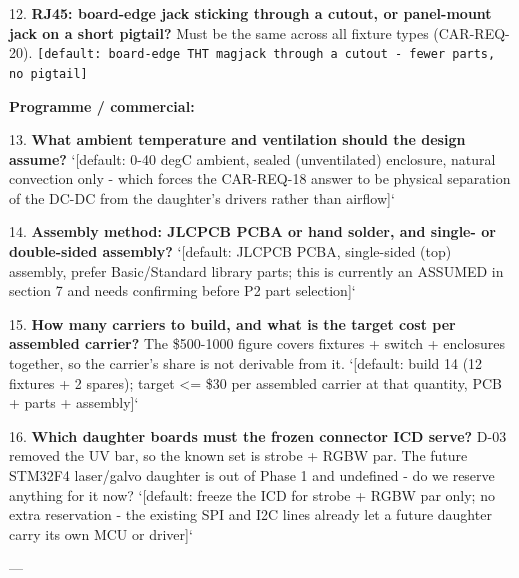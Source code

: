 \documentclass[11pt,a4paper]{article}
\begin{document}
12. \textbf{RJ45: board-edge jack sticking through a cutout, or panel-mount jack on a short pigtail?} Must be the same across all fixture types (CAR-REQ-20). \texttt{{[}default: board-edge THT magjack through a cutout - fewer parts, no pigtail{]}}

\textbf{Programme / commercial:}

13. \textbf{What ambient temperature and ventilation should the design assume?} `{[}default: 0-40 degC ambient, sealed (unventilated) enclosure, natural convection only - which forces the CAR-REQ-18 answer to be physical separation of the DC-DC from the daughter's drivers rather than airflow{]}`

14. \textbf{Assembly method: JLCPCB PCBA or hand solder, and single- or double-sided assembly?} `{[}default: JLCPCB PCBA, single-sided (top) assembly, prefer Basic/Standard library parts; this is currently an ASSUMED in section 7 and needs confirming before P2 part selection{]}`

15. \textbf{How many carriers to build, and what is the target cost per assembled carrier?} The \$500-1000 figure covers fixtures + switch + enclosures together, so the carrier's share is not derivable from it. `{[}default: build 14 (12 fixtures + 2 spares); target \textless{}= \$30 per assembled carrier at that quantity, PCB + parts + assembly{]}`

16. \textbf{Which daughter boards must the frozen connector ICD serve?} D-03 removed the UV bar, so the known set is strobe + RGBW par. The future STM32F4 laser/galvo daughter is out of Phase 1 and undefined - do we reserve anything for it now? `{[}default: freeze the ICD for strobe + RGBW par only; no extra reservation - the existing SPI and I2C lines already let a future daughter carry its own MCU or driver{]}`

---
\end{document}
